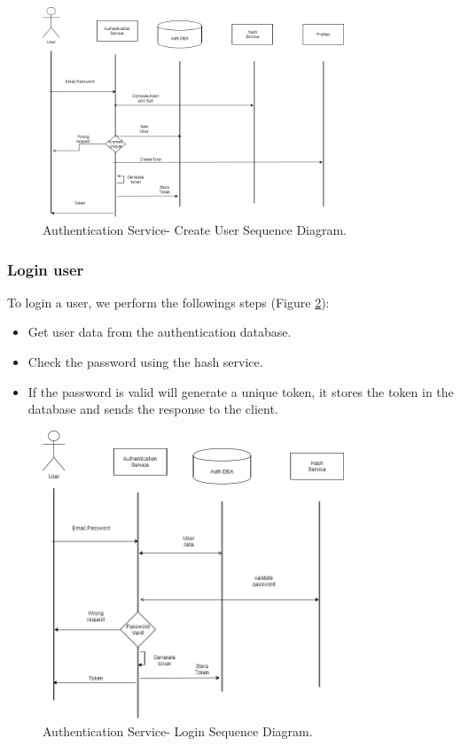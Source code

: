 \begin{figure}
\begin{center}
	\includegraphics[width=90mm,scale=1]{img/auth/CreateUser_sequence.png}
	\caption{Authentication Service- Create User Sequence Diagram.}
	\label{auth:createusersequence}
\end{center}
\end{figure}

\subsubsection{Login user}
\indent
\indent
To login a user, we perform the followings steps (Figure \ref{auth:loginsequence}):
\begin{itemize}

\item Get user data from the authentication database.
\item	Check the password using the hash service.
\item	If the password is valid will generate a unique token, it stores the token in the database and sends the response to the client.
\end{itemize}

\begin{figure}
\begin{center}
\includegraphics[width=90mm,scale=1]{img/auth/login-sequence.png}
\caption{Authentication Service- Login Sequence Diagram.}
\label{auth:loginsequence}
\end{center}

\end{figure}


